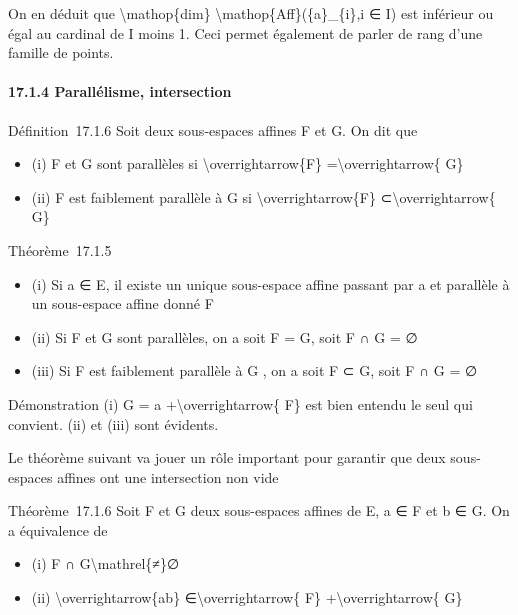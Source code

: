 \documentclass[]{article}
\begin{document}
On en déduit que \textbackslash{}mathop\{dim\}
\textbackslash{}mathop\{Aff\}(\{a\}\_\{i\},i ∈ I) est inférieur ou égal
au cardinal de I moins 1. Ceci permet également de parler de rang d'une
famille de points.

\paragraph{17.1.4 Parallélisme, intersection}

Définition~17.1.6 Soit deux sous-espaces affines F et G. On dit que

\begin{itemize}
\itemsep1pt\parskip0pt
\item
  (i) F et G sont parallèles si \textbackslash{}overrightarrow\{F\}
  =\textbackslash{}overrightarrow\{ G\}
\item
  (ii) F est faiblement parallèle à G si
  \textbackslash{}overrightarrow\{F\} ⊂\textbackslash{}overrightarrow\{
  G\}
\end{itemize}

Théorème~17.1.5

\begin{itemize}
\itemsep1pt\parskip0pt
\item
  (i) Si a ∈ E, il existe un unique sous-espace affine passant par a et
  parallèle à un sous-espace affine donné F
\item
  (ii) Si F et G sont parallèles, on a soit F = G, soit F ∩ G = ∅
\item
  (iii) Si F est faiblement parallèle à G , on a soit F ⊂ G, soit F ∩ G
  = ∅
\end{itemize}

Démonstration (i) G = a +\textbackslash{}overrightarrow\{ F\} est bien
entendu le seul qui convient. (ii) et (iii) sont évidents.

Le théorème suivant va jouer un rôle important pour garantir que deux
sous-espaces affines ont une intersection non vide

Théorème~17.1.6 Soit F et G deux sous-espaces affines de E, a ∈ F et b ∈
G. On a équivalence de

\begin{itemize}
\itemsep1pt\parskip0pt
\item
  (i) F ∩ G\textbackslash{}mathrel\{≠\}∅
\item
  (ii) \textbackslash{}overrightarrow\{ab\}
  ∈\textbackslash{}overrightarrow\{ F\}
  +\textbackslash{}overrightarrow\{ G\}
\end{itemize}
\end{document}
